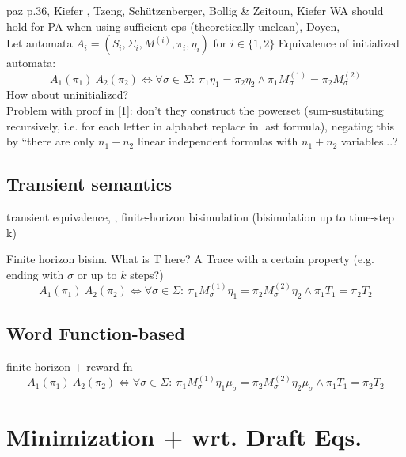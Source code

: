                 paz p.36, Kiefer  , Tzeng, Schützenberger, Bollig \& Zeitoun, Kiefer WA should hold for PA when using sufficient eps (theoretically unclean), Doyen, \\
                Let automata $A_i = \left( S_i, \Sigma_i, M^{(i)}, \pi_i, \eta_i \right)$ for $i \in \{1, 2\}$
                Equivalence of initialized automata:
                \[ A_1(\pi_1) ~ A_2(\pi_2) \Leftrightarrow \forall \sigma \in \Sigma: \ \pi_1 \eta_1 = \pi_2 \eta_2 \wedge \pi_1 M^{(1)}_{\sigma} = \pi_2 M^{(2)}_{\sigma}  \]
                How about uninitialized? \\
                
                Problem with proof in [1]: don't they construct the powerset (sum-sustituting recursively, i.e. for each letter in alphabet replace in last formula), negating this by ``there are only $n_1+n_2$ linear independent formulas with $n_1+n_2$ variables...?
                
        \subsection{Transient semantics}
        \begin{definition}
         transient equivalence, , finite-horizon bisimulation (bisimulation up to time-step k)
        \end{definition}

            Finite horizon bisim.
            What is T here? A Trace with a certain property (e.g. ending with $\sigma$ or up to $k$ steps?)
            \[ A_1(\pi_1) ~ A_2(\pi_2) \Leftrightarrow \forall \sigma \in \Sigma: \ \pi_1 M^{(1)}_{\sigma} \eta_1 = \pi_2 M^{(2)}_{\sigma} \eta_2 \wedge \pi_1 T_1 = \pi_2  T_2 \]
            
        \subsection{Word Function-based}
            finite-horizon + reward fn
            \[ A_1(\pi_1) ~ A_2(\pi_2) \Leftrightarrow \forall \sigma \in \Sigma: \ \pi_1 M^{(1)}_{\sigma} \eta_1 \mu_{\sigma} = \pi_2 M^{(2)}_{\sigma} \eta_2 \mu_{\sigma} \wedge \pi_1 T_1 = \pi_2  T_2 \]    
        
            
     
    \section{Minimization + wrt. Draft Eqs.}
